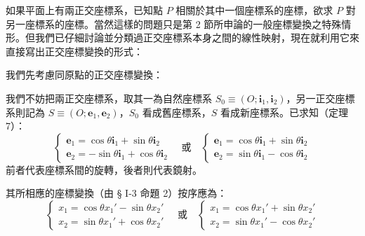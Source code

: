 如果平面上有兩正交座標系，已知點 $P$ 相關於其中一個座標系的座標，欲求 $P$ 對另一座標系的座標。當然這樣的問題只是第 2 節所申論的一般座標變換之特殊情形。但我們已仔細討論並分類過正交座標系本身之間的線性映射，現在就利用它來直接寫出正交座標變換的形式：

我們先考慮同原點的正交座標變換：

我們不妨把兩正交座標系，取其一為自然座標系 $S_0 \equiv (O; \mathbf{i}_1, \mathbf{i}_2)$，另一正交座標系則記為 $S \equiv (O; \mathbf{e}_1, \mathbf{e}_2)$，$S_0$ 看成舊座標系，$S$ 看成新座標系。已求知（定理 7）：
\begin{equation}
\begin{cases}
\mathbf{e}_1 = \cos\theta\mathbf{i}_1 + \sin\theta\mathbf{i}_2 \\
\mathbf{e}_2 = -\sin\theta\mathbf{i}_1 + \cos\theta\mathbf{i}_2
\end{cases} \quad \text{或} \quad
\begin{cases}
\mathbf{e}_1 = \cos\theta\mathbf{i}_1 + \sin\theta\mathbf{i}_2 \\
\mathbf{e}_2 = \sin\theta\mathbf{i}_1 - \cos\theta\mathbf{i}_2
\end{cases} \label{eq:b4s-1-5-1}
\end{equation}
前者代表座標系間的旋轉，後者則代表鏡射。

其所相應的座標變換（由 § I-3 命題 2）按序應為：
\begin{equation}
\begin{cases}
x_1 = \cos\theta x_1' - \sin\theta x_2' \\
x_2 = \sin\theta x_1' + \cos\theta x_2'
\end{cases} \quad \text{或} \quad
\begin{cases}
x_1 = \cos\theta x_1' + \sin\theta x_2' \\
x_2 = \sin\theta x_1' - \cos\theta x_2'
\end{cases} \label{eq:b4s-1-5-2}
\end{equation}

